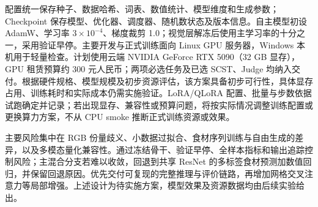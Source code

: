 配置统一保存种子、数据哈希、词表、数值统计、模型维度和生成参数；Checkpoint 保存模型、优化器、调度器、随机数状态及版本信息。自主模型初设 AdamW、学习率 $3\times10^{-4}$、梯度裁剪 1.0；视觉层解冻后使用主学习率的十分之一，采用验证早停。主要开发与正式训练面向 Linux GPU 服务器，Windows 本机用于轻量检查。计划使用云端 NVIDIA GeForce RTX 5090（32 GB 显存），GPU 租赁预算约 300 元人民币；两项必选任务及已选 SCST、Judge 均纳入交付。根据硬件规格、模型规模及初步资源评估，该方案具备初步可行性，具体显存占用、训练耗时和实际成本仍需实施验证。LoRA/QLoRA 配置、批量与步数依据试跑确定并记录；若出现显存、兼容性或预算问题，将按实际情况调整训练配置或更换算力方案，不从 CPU smoke 推断正式训练资源或效果。

主要风险集中在 RGB 份量歧义、小数据过拟合、食材序列训练与自由生成的差异，以及多模态量化兼容性。通过冻结骨干、验证早停、全样本指标和输出追踪控制风险；主混合分支若难以收敛，回退到共享 ResNet 的多标签食材预测加数值回归，并保留回退原因。优先交付可复现的完整推理与评价链路，再增加网格交叉注意力等局部增强。上述设计为待实施方案，模型效果及资源数据均由后续实验给出。
